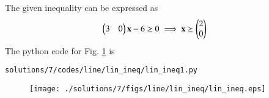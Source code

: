 
The given inequality can be expressed as 
\begin{align}
\begin{pmatrix}3&0\end{pmatrix}\mathbf{x} - 6 \geq 0
\implies \mathbf{x}&\succeq\begin{pmatrix} 2 \\ 0\end{pmatrix}
\end{align}
%
The python code for Fig. \ref{fig:3.8.7} is 
%
\begin{lstlisting}
solutions/7/codes/line/lin_ineq/lin_ineq1.py
\end{lstlisting}
\begin{figure}[!ht]
\centering
\texttt{[image: ./solutions/7/figs/line/lin\_ineq/lin\_ineq.eps]}
\caption{}
\label{fig:3.8.7}
\end{figure}
